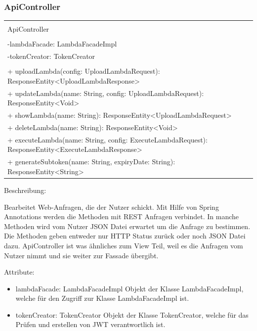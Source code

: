 \documentclass[a4paper,20pt,oneside]{book}
\begin{document}
	\subsubsection{ApiController}
	\centering
	\begin{tabular}{|l|}
	\hline \\
	ApiController\\
	\hline \\
	-lambdaFacade: LambdaFacadeImpl \\
	-tokenCreator: TokenCreator \\
	\hline \\

	+ uploadLambda(config: UploadLambdaRequest): ResponseEntity<UploadLambdaResponse> \\
	+ updateLambda(name: String, config: UploadLambdaRequest): ResponseEntity<Void>  \\
	+ showLambda(name: String): ResponseEntity<UploadLambdaRequest> \\
	+ deleteLambda(name: String): ResponseEntity<Void>  \\
	+ executeLambda(name: String, config: ExecuteLambdaRequest): ResponseEntity<ExecuteLambdaResponse> \\	
	+ generateSubtoken(name: String, expiryDate: String): ResponseEntity<String> \\
	
	\hline 
	\end{tabular}
	\vspace{0.5cm}
	\raggedright
	
	Beschreibung:
	
	Bearbeitet Web-Anfragen, die der Nutzer schickt. Mit Hilfe von Spring Annotations werden die Methoden mit REST Anfragen verbindet. In manche Methoden wird vom Nutzer JSON Datei erwartet um die Anfrage zu bestimmen. Die Methoden geben entweder nur HTTP Status zurück oder noch JSON Datei dazu.
ApiController ist was ähnliches zum View Teil, weil es die Anfragen vom Nutzer nimmt und sie weiter zur Fassade übergibt.
	
	
	\vspace{0.5cm}
	Attribute:
	\begin{itemize}
	\item lambdaFacade: LambdaFacadeImpl\linebreak
	Objekt der Klasse LambdaFacadeImpl, welche für den Zugriff zur Klasse LambdaFacadeImpl ist.
	\item tokenCreator: TokenCreator\linebreak
	Objekt der Klasse TokenCreator, welche für das Prüfen und erstellen von JWT verantwortlich ist.
	
	\end{itemize}
	
\end{document}
